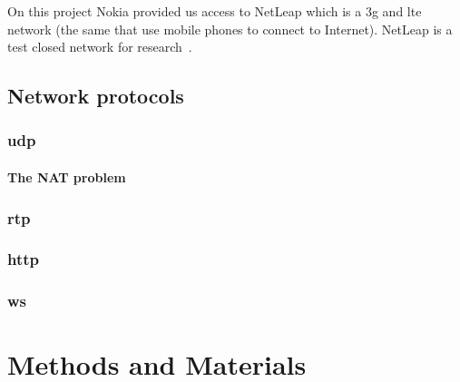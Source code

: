 \documentclass[hidelinks,11pt,a4paper,oneside,article]{memoir}
\begin{document}
On this project Nokia provided us access to NetLeap which is a \gls{3g} and \gls{lte} network (the same that use mobile phones to connect to Internet). NetLeap is a	test closed network for research~\cite{netleap}.

\section{Network protocols}


\subsection{\gls{udp}}
\subsubsection{The NAT problem}
\subsection{\gls{rtp}}
\subsection{\gls{http}}
\cite{http-rfc}
\subsection{\gls{ws}}
\cite[p.~30]{rfc6455}




\chapter{Methods and Materials}
\end{document}
